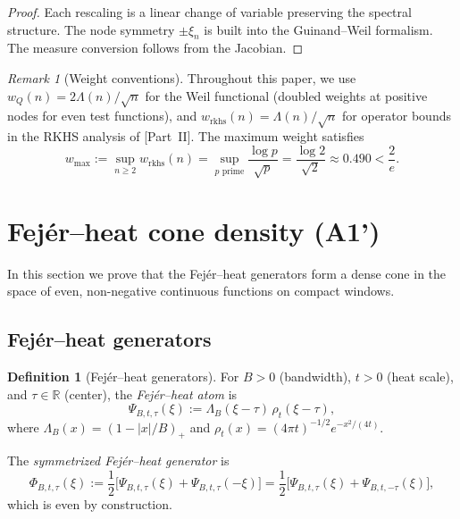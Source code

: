 \documentclass[11pt,a4paper]{article}
\theoremstyle{definition}
\newtheorem{definition}[theorem]{Definition}
\theoremstyle{remark}
\newtheorem{remark}[theorem]{Remark}
\newcommand{\R}{\mathbb{R}}
\begin{document}
\begin{proof}
Each rescaling is a linear change of variable preserving the spectral structure. The node symmetry $\pm\xi_n$ is built into the Guinand--Weil formalism. The measure conversion follows from the Jacobian.
\end{proof}

\begin{remark}[Weight conventions]\label{rem:weights}
Throughout this paper, we use $w_Q(n) = 2\Lambda(n)/\sqrt{n}$ for the Weil functional (doubled weights at positive nodes for even test functions), and $w_{\mathrm{rkhs}}(n) = \Lambda(n)/\sqrt{n}$ for operator bounds in the RKHS analysis of [Part~II]. The maximum weight satisfies
\[
  w_{\max} := \sup_{n \geq 2} w_{\mathrm{rkhs}}(n) = \sup_{p \text{ prime}} \frac{\log p}{\sqrt{p}} = \frac{\log 2}{\sqrt{2}} \approx 0.490 < \frac{2}{e}.
\]
\end{remark}

\section{Fej\'er--heat cone density (A1')}
\label{sec:A1}

In this section we prove that the Fej\'er--heat generators form a dense cone in the space of even, non-negative continuous functions on compact windows.

\subsection{Fej\'er--heat generators}

\begin{definition}[Fej\'er--heat generators]\label{def:FH-gen}
For $B > 0$ (bandwidth), $t > 0$ (heat scale), and $\tau \in \R$ (center), the \emph{Fej\'er--heat atom} is
\begin{equation}\label{eq:atom}
  \Psi_{B,t,\tau}(\xi) := \Lambda_B(\xi - \tau)\, \rho_t(\xi - \tau),
\end{equation}
where $\Lambda_B(x) = (1 - |x|/B)_+$ and $\rho_t(x) = (4\pi t)^{-1/2} e^{-x^2/(4t)}$.

The \emph{symmetrized Fej\'er--heat generator} is
\begin{equation}\label{eq:gen-sym}
  \Phi_{B,t,\tau}(\xi) := \frac{1}{2}\bigl[\Psi_{B,t,\tau}(\xi) + \Psi_{B,t,\tau}(-\xi)\bigr]
  = \frac{1}{2}\bigl[\Psi_{B,t,\tau}(\xi) + \Psi_{B,t,-\tau}(\xi)\bigr],
\end{equation}
which is even by construction.
\end{definition}
\end{document}
